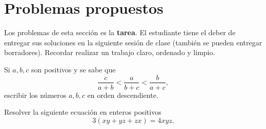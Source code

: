 \section{Problemas propuestos}

Los problemas de esta sección es la \textbf{tarea}.
El estudiante tiene el deber de entregar sus soluciones en la siguiente sesión de clase (también se pueden entregar borradores).
Recordar realizar un trabajo claro, ordenado y limpio.


\begin{exercise}
    Si $a,b,c$ son positivos y se sabe que
    \[
        \frac{c}{a + b} < \frac{a}{b + c} < \frac{b}{a + c},
    \]
    escribir los números $a,b,c$ en orden descendiente.
\end{exercise}

\begin{exercise}
    Resolver la siguiente ecuación en enteros positivos
    \[
        3(xy + yz + zx) = 4xyz.
    \]
\end{exercise}